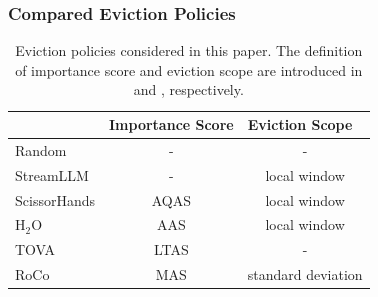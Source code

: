\subsubsection{Compared Eviction Policies}
\begin{table}[h]
    \small
    \centering
    \begin{tabular}{l|cc}
     \toprule
     & \multicolumn{1}{l}{\textbf{Importance Score}} & \multicolumn{1}{l}{\textbf{Eviction Scope}} \\
     \midrule
    Random       & -    & -                \\
    StreamLLM   & -    & local window    \\
    ScissorHands & AQAS & local window       \\
    H$_{\text{2}}$O          & AAS  & local window       \\
    TOVA         & LTAS & -                \\
    RoCo         & MAS  & standard deviation \\
    \bottomrule
    \end{tabular}
    \caption{Eviction policies considered in this paper. The definition of importance score and eviction scope are introduced in  and , respectively.}
    \label{tab:policies}
\end{table}
